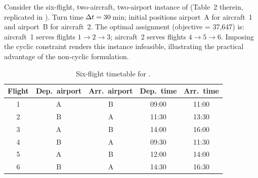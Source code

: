 \begin{example}
  \label{ex:basic}
  Consider the six-flight, two-aircraft, two-airport instance of
  \citet{khaled2018compact} (Table~2 therein, replicated in
  ).  Turn time $\Delta t = 30$\,min; initial positions
  airport~A for aircraft~1 and airport~B for aircraft~2.  The optimal
  assignment (objective = 37{,}647) is: aircraft~1 serves flights $1 \to 2
  \to 3$; aircraft~2 serves flights $4 \to 5 \to 6$.  Imposing the cyclic
  constraint renders this instance infeasible, illustrating the practical
  advantage of the non-cyclic formulation.
\end{example}

\begin{table}[t]
\centering\small
\caption{Six-flight timetable for .}
\label{tab:example_timetable}
\begin{tabular}{ccccc}
\toprule
Flight & Dep.\ airport & Arr.\ airport & Dep.\ time & Arr.\ time \\
\midrule
1 & A & B & 09:00 & 11:00 \\
2 & B & A & 11:30 & 13:30 \\
3 & A & B & 14:00 & 16:00 \\
4 & B & A & 09:30 & 11:30 \\
5 & A & B & 12:00 & 14:00 \\
6 & B & A & 14:30 & 16:30 \\
\bottomrule
\end{tabular}
\end{table}
